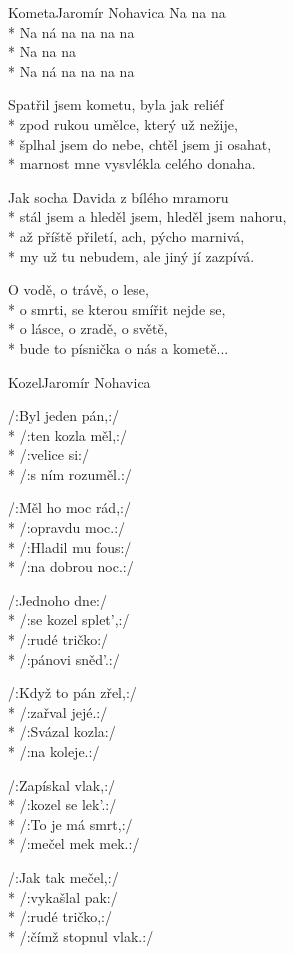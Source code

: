 \documentclass[10.5pt]{book}
\begin{document}
\begin{poem}{Kometa}{Jaromír Nohavica}
Na na na\\*
Na ná na na na na\\*
Na na na\\*
Na ná na na na na

Spatřil jsem kometu, byla jak reliéf\\*
zpod rukou umělce, který už nežije,\\*
šplhal jsem do nebe, chtěl jsem ji osahat,\\*
marnost mne vysvlékla celého donaha.

Jak socha Davida z bílého mramoru\\*
stál jsem a hleděl jsem, hleděl jsem nahoru,\\*
až příště přiletí, ach, pýcho marnivá,\\*
my už tu nebudem, ale jiný jí zazpívá.

O vodě, o trávě, o lese,\\*
o smrti, se kterou smířit nejde se,\\*
o lásce, o zradě, o světě,\\*
bude to písnička o nás a kometě...

\end{poem}

\begin{poem}{Kozel}{Jaromír Nohavica}

\settowidth{\versewidth}{a o všech lidech, co kdy žili na téhle planetě.}

/:Byl jeden pán,:/\\*
/:ten kozla měl,:/\\*
/:velice si:/\\*
/:s ním rozuměl.:/

/:Měl ho moc rád,:/\\*
/:opravdu moc.:/\\*
/:Hladil mu fous:/\\*
/:na dobrou noc.:/

/:Jednoho dne:/\\*
/:se kozel splet',:/\\*
/:rudé tričko:/\\*
/:pánovi sněd'.:/

/:Když to pán zřel,:/\\*
/:zařval jejé.:/\\*
/:Svázal kozla:/\\*
/:na koleje.:/

/:Zapískal vlak,:/\\*
/:kozel se lek'.:/\\*
/:To je má smrt,:/\\*
/:mečel mek mek.:/

/:Jak tak mečel,:/\\*
/:vykašlal pak:/\\*
/:rudé tričko,:/\\*
/:čímž stopnul vlak.:/

\end{poem}
\end{document}
